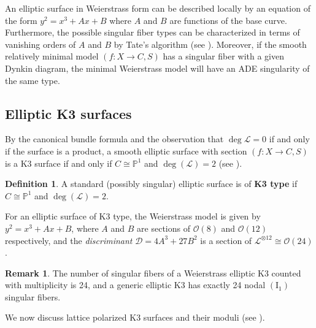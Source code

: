 \documentclass[11pt]{amsart}
\theoremstyle{definition}
\newtheorem{definition}[theorem]{Definition}
\newtheorem{remark}[theorem]{Remark}
\theoremstyle{remark}
\newcommand{\bP}{{\mathbb P}}
\newcommand{\calO}{\mathcal O}
\newcommand{\mb}[1]{\mathbb{#1}}
\begin{document}
	An elliptic surface in Weierstrass form can be described locally by an equation of the form $y^2 = x^3 + Ax + B$ where $A$ and $B$ are functions of the base curve. Furthermore, the possible singular fiber types  can be characterized in terms of vanishing orders of $A$ and $B$ by Tate's algorithm (see \cite[Table 1]{sselliptic}). Moreover, if the smooth relatively minimal model $(f : X \to C, S)$ has a singular fiber with a given Dynkin diagram, the minimal Weierstrass  model will have an ADE singularity of the same type. 
	
	
	
	\subsection{Elliptic K3 surfaces}
	
	By the canonical bundle formula and the observation that $\deg \mathscr{L} = 0$ if and only if the surface is a product, a smooth elliptic surface with section $(f : X \to C, S)$ is a K3 surface if and only if $C \cong \mb{P}^1$ and $\deg(\mathscr{L}) = 2$ (see \cite[III.4.6]{mir3}). 
	
	\begin{definition} A standard (possibly singular) elliptic surface is of \textbf{K3 type} if $C \cong \bP^1$ and $\deg(\mathscr{L}) = 2$. \end{definition}
	
	For an elliptic surface of K3 type, the Weierstrass model is given by $y^2 = x^3 + Ax + B$, where $A$ and $B$ are sections of $\calO(8)$ and $\calO(12)$ respectively, and the \emph{discriminant} $\mathscr{D} = 4A^3 + 27B^2$ is a section of $\mathscr{L}^{\otimes 12} \cong \calO(24)$. 
	
	
	\begin{remark}\label{rmk:singfibers} The number of singular fibers of a Weierstrass elliptic K3 counted with multiplicity is 24, and a generic elliptic K3 has exactly 24 nodal $(\mathrm{I}_1)$ singular fibers. \end{remark}
	
	
	We now discuss lattice polarized K3 surfaces and their moduli (see \cite{HT, friedman, friedmanbook}). 
	
	
	
\end{document}
